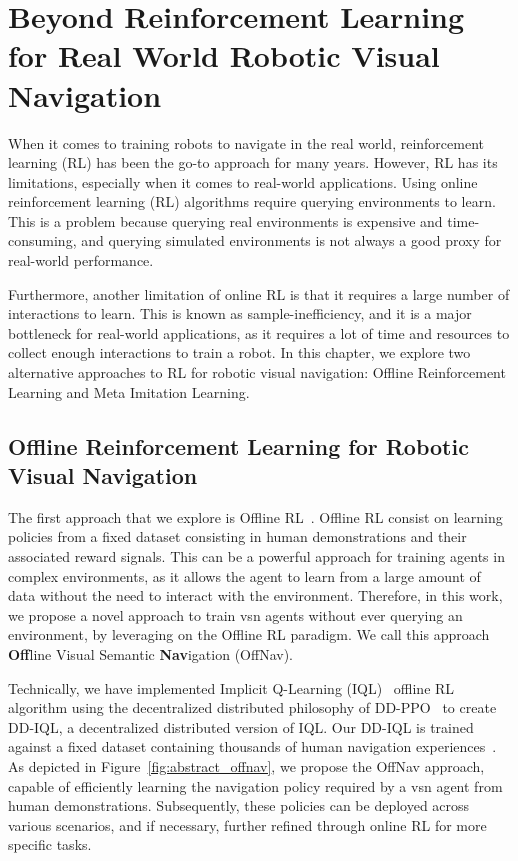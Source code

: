 \chapter[Beyond RL for Real World Robotic Navigation]{Beyond Reinforcement Learning for Real World Robotic Visual Navigation}\label{ch:beyond-rl}

When it comes to training robots to navigate in the real world, reinforcement learning (RL) has been the go-to approach for many years.
However, RL has its limitations, especially when it comes to real-world applications.
Using online reinforcement learning (RL) algorithms require querying environments to learn.
This is a problem because querying real environments is expensive and time-consuming, and querying simulated environments is not always a good proxy for real-world performance.

Furthermore, another limitation of online RL is that it requires a large number of interactions to learn.
This is known as sample-inefficiency, and it is a major bottleneck for real-world applications, as it requires a lot of time and resources to collect enough interactions to train a robot.
In this chapter, we explore two alternative approaches to RL for robotic visual navigation: Offline Reinforcement Learning and Meta Imitation Learning.


\section{Offline Reinforcement Learning for Robotic Visual Navigation}\label{sec:offline_rl4rvsn}

The first approach that we explore is Offline RL~\cite{levine2020}.
Offline RL consist on learning policies from a fixed dataset consisting in human demonstrations and their associated reward signals.
This can be a powerful approach for training agents in complex environments, as it allows the agent to learn from a large amount of data without the need to interact with the environment.
Therefore, in this work, we propose a novel approach to train \acrshort{vsn} agents without ever querying an environment, by leveraging on the Offline RL paradigm.
We call this approach \textbf{Off}line Visual Semantic \textbf{Nav}igation (OffNav).

Technically, we have implemented Implicit Q-Learning (IQL)~\cite{kostrikov2022offline} offline RL algorithm using the decentralized distributed philosophy of DD-PPO~\cite{wijmans2020} to create DD-IQL, a decentralized distributed version of IQL\@.
Our DD-IQL is trained against a fixed dataset containing thousands of human navigation experiences~\cite{ramrakhya2023}.
As depicted in Figure~\ref{fig:abstract_offnav}, we propose the OffNav approach, capable of efficiently learning the navigation policy required by a \acrshort{vsn} agent from human demonstrations.
Subsequently, these policies can be deployed across various scenarios, and if necessary, further refined through online RL for more specific tasks.


